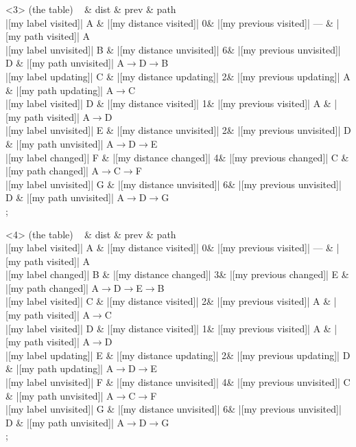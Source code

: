 \begin{visibleenv}<3>
 (the table) {
~ \& dist \& prev \& path \\
|[my label visited]| A \& |[my distance visited]| 0\& |[my previous visited]| --- \& |[my path visited]| A\\
|[my label unvisited]| B \& |[my distance unvisited]| 6\& |[my previous unvisited]| D \& |[my path unvisited]| A$\rightarrow$D$\rightarrow$B\\
|[my label updating]| C \& |[my distance updating]| 2\& |[my previous updating]| A \& |[my path updating]| A$\rightarrow$C\\
|[my label visited]| D \& |[my distance visited]| 1\& |[my previous visited]| A \& |[my path visited]| A$\rightarrow$D\\
|[my label unvisited]| E \& |[my distance unvisited]| 2\& |[my previous unvisited]| D \& |[my path unvisited]| A$\rightarrow$D$\rightarrow$E\\
|[my label changed]| F \& |[my distance changed]| 4\& |[my previous changed]| C \& |[my path changed]| A$\rightarrow$C$\rightarrow$F\\
|[my label unvisited]| G \& |[my distance unvisited]| 6\& |[my previous unvisited]| D \& |[my path unvisited]| A$\rightarrow$D$\rightarrow$G\\
};
\end{visibleenv}
            
\begin{visibleenv}<4>
 (the table) {
~ \& dist \& prev \& path \\
|[my label visited]| A \& |[my distance visited]| 0\& |[my previous visited]| --- \& |[my path visited]| A\\
|[my label changed]| B \& |[my distance changed]| 3\& |[my previous changed]| E \& |[my path changed]| A$\rightarrow$D$\rightarrow$E$\rightarrow$B\\
|[my label visited]| C \& |[my distance visited]| 2\& |[my previous visited]| A \& |[my path visited]| A$\rightarrow$C\\
|[my label visited]| D \& |[my distance visited]| 1\& |[my previous visited]| A \& |[my path visited]| A$\rightarrow$D\\
|[my label updating]| E \& |[my distance updating]| 2\& |[my previous updating]| D \& |[my path updating]| A$\rightarrow$D$\rightarrow$E\\
|[my label unvisited]| F \& |[my distance unvisited]| 4\& |[my previous unvisited]| C \& |[my path unvisited]| A$\rightarrow$C$\rightarrow$F\\
|[my label unvisited]| G \& |[my distance unvisited]| 6\& |[my previous unvisited]| D \& |[my path unvisited]| A$\rightarrow$D$\rightarrow$G\\
};
\end{visibleenv}
            
